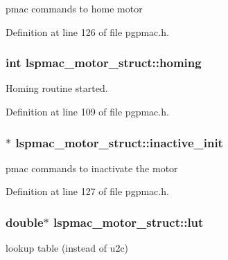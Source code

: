 pmac commands to home motor 



Definition at line 126 of file pgpmac.\-h.

\hypertarget{structlspmac__motor__struct_aa74108855693f94fc2ff76333c9fb6ac}{
\subsubsection[{homing}]{\setlength{\rightskip}{0pt plus 5cm}int lspmac\-\_\-motor\-\_\-struct\-::homing}}\label{structlspmac__motor__struct_aa74108855693f94fc2ff76333c9fb6ac}


Homing routine started. 



Definition at line 109 of file pgpmac.\-h.

\hypertarget{structlspmac__motor__struct_ab329ce9b277eca9984c18417dece7bf7}{
\subsubsection[{inactive\-\_\-init}]{$\ast$ lspmac\-\_\-motor\-\_\-struct\-::inactive\-\_\-init}}\label{structlspmac__motor__struct_ab329ce9b277eca9984c18417dece7bf7}


pmac commands to inactivate the motor 



Definition at line 127 of file pgpmac.\-h.

\hypertarget{structlspmac__motor__struct_a7b43671f7f3e06521f6cf91fb9ac707d}{
\subsubsection[{lut}]{\setlength{\rightskip}{0pt plus 5cm}double$\ast$ lspmac\-\_\-motor\-\_\-struct\-::lut}}\label{structlspmac__motor__struct_a7b43671f7f3e06521f6cf91fb9ac707d}


lookup table (instead of u2c) 



